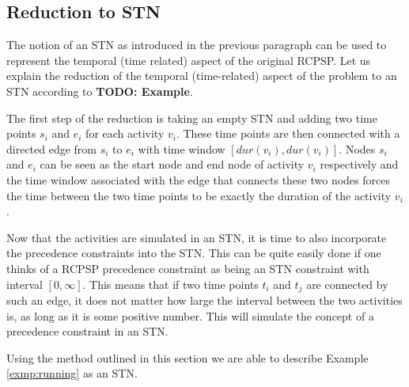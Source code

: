 \documentclass{article}
\theoremstyle{definition}
\newcommand{\TODO}[1]{{\color{red}\textbf{TODO: #1}}}
\newcommand{\dur}[1]{\ensuremath{dur(v_{#1})}} %
\begin{document}
\subsection{Reduction to STN}
The notion of an STN as introduced in the previous paragraph can be used to represent the temporal (time related) aspect of the original RCPSP. Let us explain the reduction of the temporal (time-related) aspect of the problem to an STN according to \TODO{Example}.

The first step of the reduction is taking an empty STN and adding two time points $s_i$ and $e_i$ for each activity $v_i$. 
These time points are then connected with a directed edge from $s_i$ to $e_i$ with time window $[\dur{i}, \dur{i}]$. 
Nodes $s_i$ and $e_i$ can be seen as the start node and end node of activity $v_i$ respectively and the time window associated with the edge that connects these two nodes forces the time between the two time points to be exactly the duration of the activity $v_i$.

Now that the activities are simulated in an STN, it is time to also incorporate the precedence constraints into the STN. This can be quite easily done if one thinks of a RCPSP precedence constraint as being an STN constraint with interval $[0,\infty]$. This means that if two time points $t_i$ and $t_j$ are connected by such an edge, it does not matter how large the interval between the two activities is, as long as it is some positive number. This will simulate the concept of a precedence constraint in an STN.

Using the method outlined in this section we are able to describe Example \ref{exmp:running} as an STN.
\end{document}
